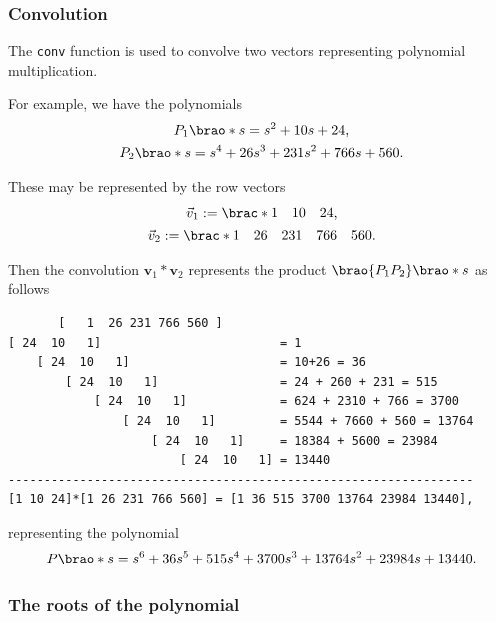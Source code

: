 \documentclass[12pt]{article}
\DeclarePairedDelimiter\brao()%
\DeclarePairedDelimiter\brac[]%
\begin{document}
\subsubsection{Convolution}\label{sss:conv}

The \texttt{conv} function is used to convolve two vectors representing polynomial multiplication.

For example, we have the polynomials
\[
    \begin{gathered}
        P_1\brao*s = s^2 + 10s + 24\rlap, \\*
        P_2\brao*s = s^4 + 26s^3 + 231s^2 + 766s + 560\rlap. \\*
    \end{gathered}
\]

These may be represented by the row vectors
\[
    \begin{gathered}
        \vec{v}_1 := \brac*{\begin{matrix} 1 & 10 & 24 \\* \end{matrix}}\rlap, \\*
        \vec{v}_2 := \brac*{\begin{matrix} 1 & 26 & 231 & 766 & 560 \\* \end{matrix}}\rlap. \\*
    \end{gathered}
\]

\pagebreak

Then the convolution $\mathbf{v}_1 \ast \mathbf{v}_2$ represents the product $\brao{P_1 P_2}\brao*s$ as follows

\begin{verbatim}
       [   1  26 231 766 560 ]
[ 24  10   1]                         = 1
    [ 24  10   1]                     = 10+26 = 36
        [ 24  10   1]                 = 24 + 260 + 231 = 515
            [ 24  10   1]             = 624 + 2310 + 766 = 3700
                [ 24  10   1]         = 5544 + 7660 + 560 = 13764
                    [ 24  10   1]     = 18384 + 5600 = 23984
                        [ 24  10   1] = 13440
-----------------------------------------------------------------
[1 10 24]*[1 26 231 766 560] = [1 36 515 3700 13764 23984 13440],
\end{verbatim}

representing the polynomial
\[
    P\brao*s = s^6 + 36s^5 + 515s^4 + 3700s^3 + 13764s^2 + 23984s + 13440\rlap.
\]

\subsubsection{The roots of the polynomial}
\end{document}

